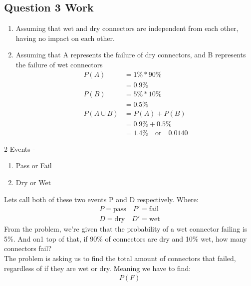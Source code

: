 \documentclass[../INDE315_HW.tex]{subfiles}
\begin{document}
\subsection*{Question 3 Work}
\begin{enumerate}
    \item Assuming that wet and dry connectors are independent from each other, having no impact on each other.
    \item Assuming that A represents the failure of dry connectors, and B represents the failure of wet connectors
    \begin{equation*}
        \begin{aligned}
            P(A) &= 1\% * 90\% \\
                &= 0.9\% \\
            P(B) &= 5\% * 10\% \\
                &= 0.5\% \\
            P(A \cup B) &= P(A) + P(B) \\
                &= 0.9\% + 0.5\% \\
                &= 1.4\% \quad \text{or} \quad 0.0140
        \end{aligned}
    \end{equation*}
\end{enumerate}
2 Events - 
\begin{enumerate}
    \item Pass or Fail
    \item Dry or Wet
\end{enumerate}
Lets call both of these two events P and D respectively. Where:
\begin{equation*}
    \begin{aligned}
        P = \text{pass} \quad P' = \text{fail} \\
        D = \text{dry} \quad D' = \text{wet} 
    \end{aligned}
\end{equation*}
From the problem, we're given that the probability of a wet connector failing is 5\%. And on1 top of that, if 90\% of connectors are dry and 10\% wet, how many connectors fail? \\
The problem is asking us to find the total amount of connectors that failed, regardless of if they are wet or dry. Meaning we have to find:
\begin{equation*}
    \begin{aligned}
        P(F)
    \end{aligned}
\end{equation*}
\end{document}
